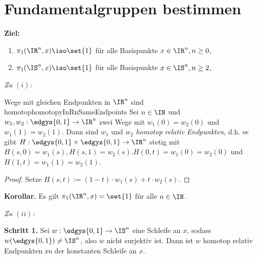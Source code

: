 \documentclass[language=ngerman]{TemplateLecture} %
\begin{document}
\section{Fundamentalgruppen bestimmen}

\textbf{Ziel:} 
\begin{enumerate}[$(i)$]
    \item $\pi_1(\IR^n, x) \iso \set{1}$ für alle Basispunkte $x \in \IR^n, n \geq 0$,
    \item $\pi_1(\IS^n, x) \iso \set{1}$ für alle Basispunkte $x \in \IS^n, n \geq 2$,
\end{enumerate}

\emph{Zu $(i)$:}

\begin{thm}{Wege mit gleichen Endpunkten in $\IR^n$ sind homotop}{homotopyInRnSameEndpoints}
    Sei $n \in \IN$ und $w_1, w_2: \edgys{0,1} \to \IR^n$ zwei Wege mit $w_1(0) = w_2(0)$ und $w_1(1) = w_2(1)$. Dann sind $w_1$ und $w_2$ \emph{homotop relativ Endpunkten}, d.h. es gibt $H: \edgys{0,1} \times \edgys{0,1} \to \IR^n$ stetig mit $H(s, 0) = w_1(s), H(s, 1) = w_2(s). H(0, t) = w_1(0) = w_2(0)$ und $H(1, t) = w_1(1) = w_2(1)$.
\end{thm}

\begin{proof}
    Setze $H(s, t) := (1-t) \cdot w_1(s) + t \cdot w_2(s)$.
\end{proof}

\textbf{Korollar.} Es gilt $\pi_1(\IR^n, x) = \set{1}$ für alle $n \in \IN$.

\emph{Zu $(ii)$:}

\textbf{Schritt 1.} Sei $w: \edgys{0,1} \to \IS^n$ eine Schleife an $x$, sodass $w(\edgys{0,1}) \neq \IS^n$, also $w$ nicht surjektiv ist. Dann ist $w$ homotop relativ Endpunkten zu der konstanten Schleife an $x$.
\end{document}

